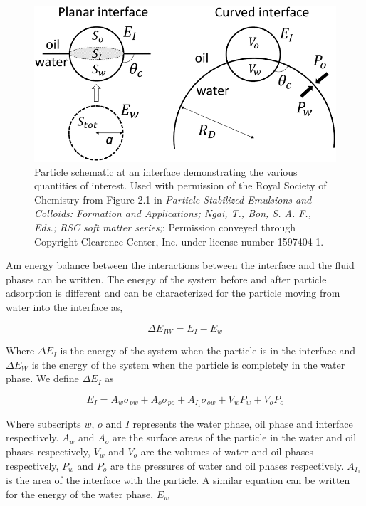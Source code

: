 \begin{figure}
    \centering
    \includegraphics[scale = 0.5]{../figures/literature_review/particle_at_interface.png }
    \caption{Particle schematic at an interface demonstrating the various quantities of interest. Used with permission of the Royal Society of Chemistry from 
             Figure 2.1 in \textit{Particle-Stabilized Emulsions and Colloids: Formation and Applications; Ngai, T., Bon, S. A. F., Eds.; RSC soft matter series;};
             Permission conveyed through Copyright Clearence Center, Inc. under license number 1597404-1.}
    \label{fig:pieranski_model}
\end{figure}

Am energy balance between the interactions between the interface and the fluid phases can be written. The energy of the system before and after particle adsorption is 
different and can be characterized for the particle moving from water into the interface as,

\begin{equation}
    \Delta E_{IW} = E_I - E_w
\end{equation}

Where $\Delta E_{I}$ is the energy of the system when the particle is in the interface and $\Delta E_W$ is the energy of the system when the particle is completely in the water phase.
We define $\Delta E_{I}$ as

\begin{equation}
    E_I = A_w \sigma_{pw} + A_o\sigma_{po} + A_{I_1}\sigma_{ow} + V_w P_w + V_o P_o
\end{equation}

Where subscripts $w$, $o$ and $I$ represents the water phase, oil phase and interface respectively. $A_w$ and $A_o$ are the surface areas of the particle in the water and oil phases 
respectively, $V_w$ and $V_o$ are the volumes of water and oil phases respectively, $P_w$ and $P_o$ are the pressures of water and oil phases respectively. $A_{I_1}$ is the area of the 
interface with the particle. A similar equation can be written for the energy of the water phase, $E_w$

